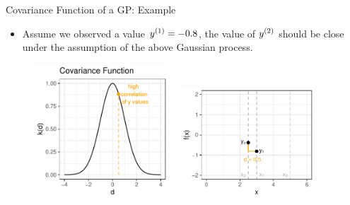 \documentclass[11pt,compress,t,notes=noshow, xcolor=table]{beamer}
\begin{document}
\begin{vbframe}{Covariance Function of a GP: Example} 

\begin{itemize}
  \item Assume we observed a value $\yi[1] = - 0.8$, the value of $\yi[2]$ should be close under the assumption of the above Gaussian process. 
\end{itemize}

\begin{figure}
  \includegraphics[width=0.45\textwidth]{figure/covariance2point/example_covariance_1.pdf} ~      \includegraphics[width=0.45\textwidth]{figure/covariance2point/example_function_1_2.pdf}
\end{figure}

\end{vbframe}
\end{document}
